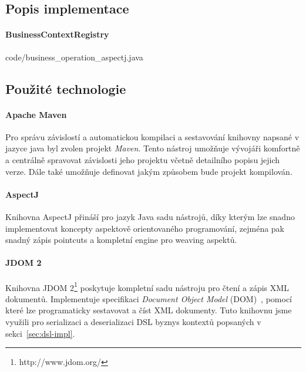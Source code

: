 \subsection{Popis implementace}

\paragraph{BusinessContextRegistry}


{code/business_operation_aspectj.java}

\subsection{Použité technologie}

\paragraph{Apache Maven}

Pro správu závislostí a automatickou kompilaci a sestavování
knihovny napsané v jazyce java byl zvolen projekt \textit{Maven}. %
Tento nástroj umožňuje vývojáři komfortně a centrálně
spravovat závislosti jeho projektu včetně detailního
popisu jejich verze. Dále také umožňuje definovat jakým
způsobem bude projekt kompilován.

\paragraph{AspectJ}

Knihovna AspectJ přináší pro jazyk Java sadu nástrojů,
díky kterým lze snadno implementovat koncepty aspektově orientovaného
programování, zejména pak snadný zápis pointcuts a kompletní
engine pro weaving aspektů.


\paragraph{JDOM 2}

Knihovna JDOM 2\footnote{http://www.jdom.org/} poskytuje
kompletní sadu nástroju pro čtení a zápis XML dokumentů.
Implementuje specifikaci \textit{Document Object Model} (DOM)~\cite{wood2004document},
pomocí které lze programaticky sestavovat a číst XML dokumenty.
Tuto knihovnu jsme využili pro serializaci a deserializaci
DSL byznys kontextů popsaných v sekci~\ref{sec:dsl-impl}.

